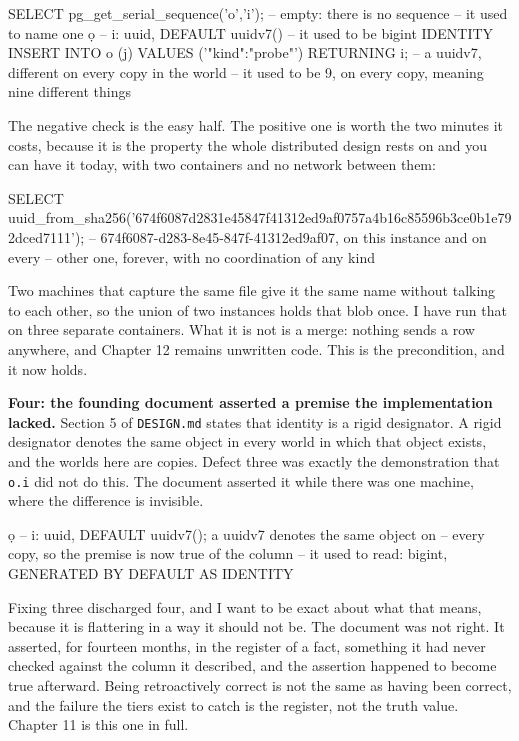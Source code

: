 \begin{Check}
SELECT pg_get_serial_sequence('o','i');   -- empty: there is no sequence
                                          -- it used to name one
\d o                                      -- i: uuid, DEFAULT uuidv7()
                                          -- it used to be bigint IDENTITY
INSERT INTO o (j) VALUES ('{"kind":"probe"}') RETURNING i;
--   a uuidv7, different on every copy in the world
--   it used to be 9, on every copy, meaning nine different things
\end{Check}

The negative check is the easy half. The positive one is worth the two minutes it costs, because it is the property the whole distributed design rests on and you can have it today, with two containers and no network between them:

\begin{Check}
SELECT uuid_from_sha256('674f6087d2831e45847f41312ed9af0757a4b16c85596b3ce0b1e792dced7111');
--   674f6087-d283-8e45-847f-41312ed9af07, on this instance and on every
--   other one, forever, with no coordination of any kind
\end{Check}

Two machines that capture the same file give it the same name without talking to each other, so the union of two instances holds that blob once. I have run that on three separate containers. What it is not is a merge: nothing sends a row anywhere, and Chapter 12 remains unwritten code. This is the precondition, and it now holds.

\textbf{Four: the founding document asserted a premise the implementation lacked.} Section 5 of \texttt{DESIGN.md} states that identity is a rigid designator. A rigid designator denotes the same object in every world in which that object exists, and the worlds here are copies. Defect three was exactly the demonstration that \texttt{o.i} did not do this. The document asserted it while there was one machine, where the difference is invisible.

\begin{Check}
\d o    -- i: uuid, DEFAULT uuidv7(); a uuidv7 denotes the same object on
        -- every copy, so the premise is now true of the column
        -- it used to read: bigint, GENERATED BY DEFAULT AS IDENTITY
\end{Check}

Fixing three discharged four, and I want to be exact about what that means, because it is flattering in a way it should not be. The document was not right. It asserted, for fourteen months, in the register of a fact, something it had never checked against the column it described, and the assertion happened to become true afterward. Being retroactively correct is not the same as having been correct, and the failure the tiers exist to catch is the register, not the truth value. Chapter 11 is this one in full.

